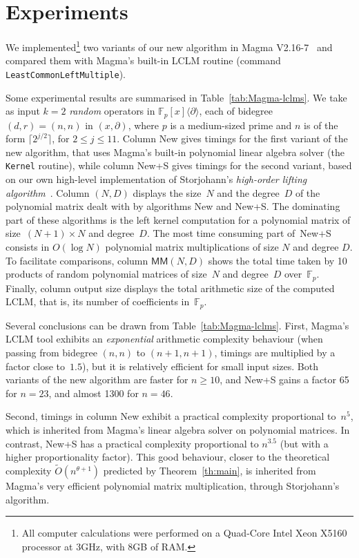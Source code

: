 \documentclass{sig-alt-full}
\def\MM {\ensuremath{\mathsf{MM}}}
\def\F {\ensuremath{\mathbb{F}}}
\newcommand{\x}{x}
\newcommand{\Dx}{\partial}
\newcommand{\bigOsoft}{\widetilde{{O}}}
\begin{document}
\vspace{-0.1cm}

\section{Experiments}

We implemented\footnote{All computer calculations were performed on a
Quad-Core Intel Xeon X5160 processor at 3GHz, with 8GB of RAM.} two variants
of our new algorithm in Magma V2.16-7~\cite{magma} and compared them with
Magma's built-in LCLM routine (command \verb+LeastCommonLeftMultiple+).

Some experimental results are summarised in Table~\ref{tab:Magma-lclms}. We
take as input $k=2$ \emph{random\/} operators in $\F_p[\x]\langle \Dx\rangle$,
each of bidegree~$(d,r) = (n,n)$ in $(x,\Dx)$, where $p$ is a medium-sized
prime and $n$ is of the form $\lceil 2^{j/2} \rceil$, for $2\leq j \leq 11$.
Column {\sf New} gives timings for the first variant of the new algorithm,
that uses Magma's built-in polynomial linear algebra solver (the \verb+Kernel+
routine), while column {\sf New+S} gives timings for the second variant, based
on our own high-level implementation of Storjohann's \emph{high-order lifting
algorithm}~\cite{Storjohann03}. Column $(N,D)$ displays the size~$N$ and the
degree~$D$ of the polynomial matrix dealt with by algorithms {\sf New} and
{\sf New+S}. The dominating part of these algorithms is the left kernel
computation for a polynomial matrix of size~$(N+1) \times N$ and degree~$D$.
The most time consuming part of~{\sf New+S} consists in $O(\log N)$ polynomial
matrix multiplications of size $N$ and degree $D$. To facilitate comparisons,
column $\MM(N,D)$ shows the total time taken by 10 products of random
polynomial matrices of size~$N$ and degree~$D$ over~$\F_p$. Finally, column
{\sf output size} displays the total arithmetic size of the computed LCLM,
that is, its number of coefficients in~$\F_p$.

Several conclusions can be drawn from
Table~\ref{tab:Magma-lclms}. First, Magma's LCLM tool exhibits an
\emph{exponential\/} arithmetic complexity behaviour (when passing from
bidegree $(n,n)$ to $(n+1,n+1)$, timings are multiplied by a factor close
to~$1.5$), but it is relatively efficient for small input sizes. Both variants
of the new algorithm are faster for $n\geq 10$, and {\sf New+S} gains a factor
65 for $n=23$, and almost 1300 for $n=46$.

Second, timings in column {\sf New} exhibit a practical complexity
proportional to~$n^5$, which is inherited from Magma's linear algebra solver
on polynomial matrices. In contrast, {\sf New+S} has a practical complexity
proportional to $n^{3.5}$ (but with a higher proportionality factor). This
good behaviour, closer to the theoretical complexity $\bigOsoft(n^{\theta+1})$
predicted by Theorem~\ref{th:main}, is inherited from Magma's very efficient
polynomial matrix multiplication, through Storjohann's algorithm.
\end{document}
